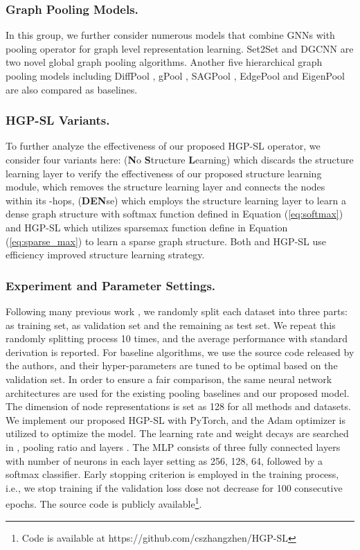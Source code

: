 \documentclass[letterpaper]{article} \usepackage{aaai20}  \usepackage{times}  \usepackage{helvet} \usepackage{courier}  \usepackage[hyphens]{url}  \usepackage{graphicx} \urlstyle{rm} \def\UrlFont{\rm}  \usepackage{graphicx}  \frenchspacing  \setlength{\pdfpagewidth}{8.5in}  \setlength{\pdfpageheight}{11in}
\begin{document}
\subsubsection{Graph Pooling Models.}
In this group, we further consider numerous models that combine GNNs with pooling operator for graph level representation learning. Set2Set \cite{vinyals2015order} and DGCNN \cite{zhang2018end} are two novel global graph pooling algorithms. Another five hierarchical graph pooling models including DiffPool \cite{ying2018hierarchical}, gPool \cite{gao2019graph}, SAGPool \cite{lee2019self}, EdgePool \cite{diehl2019edge} and EigenPool \cite{ma2019graph} are also compared as baselines. 
\subsubsection{HGP-SL Variants.}
To further analyze the effectiveness of our proposed HGP-SL operator, we consider four variants here:  (\textbf{N}o \textbf{S}tructure \textbf{L}earning) which discards the structure learning layer to verify the effectiveness of our proposed structure learning module,  which removes the structure learning layer and connects the nodes within its -hops,  (\textbf{DEN}se) which employs the structure learning layer to learn a dense graph structure with softmax function defined in Equation (\ref{eq:softmax}) and HGP-SL which utilizes sparsemax function define in Equation (\ref{eq:sparse_max}) to learn a sparse graph structure. Both  and HGP-SL use efficiency improved structure learning strategy.
\subsubsection{Experiment and Parameter Settings.}
Following many previous work \cite{ying2018hierarchical,ma2019graph}, we randomly split each dataset into three parts:  as training set,  as validation set and the remaining  as test set. We repeat this randomly splitting process 10 times, and the average performance with standard derivation is reported. For baseline algorithms, we use the source code released by the authors, and their hyper-parameters are tuned to be optimal based on the validation set. In order to ensure a fair comparison, the same neural network architectures are used for the existing pooling baselines and our proposed model. The dimension of node representations is set as 128 for all methods and datasets. We implement our proposed HGP-SL with PyTorch, and the Adam optimizer is utilized to optimize the model. The learning rate and weight decays are searched in , pooling ratio  and layers . The MLP consists of three fully connected layers with number of neurons in each layer setting as 256, 128, 64, followed by a softmax classifier. Early stopping criterion is employed in the training process, i.e., we stop training if the validation loss dose not decrease for 100 consecutive epochs. The source code is publicly available\footnote{Code is available at https://github.com/cszhangzhen/HGP-SL}.
\end{document}
